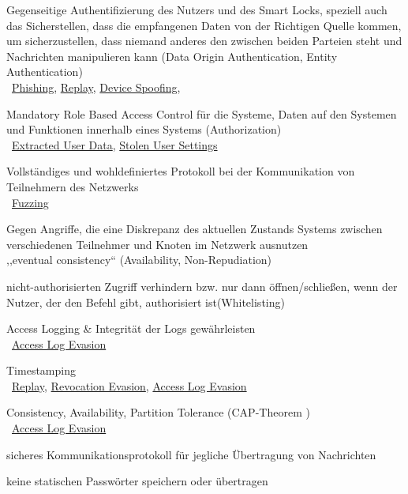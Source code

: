     \begin{SA}[noitemsep]
        \item \label{sa:1}Gegenseitige Authentifizierung des Nutzers und des Smart Locks, speziell auch das Sicherstellen, dass die empfangenen Daten von der Richtigen Quelle kommen, um sicherzustellen, dass niemand anderes den zwischen beiden Parteien steht und Nachrichten manipulieren kann (Data Origin Authentication, Entity Authentication)\\
            \textrightarrow\ \hyperref[vuln:phishing]{Phishing}, \hyperref[vuln:replay]{Replay}, \hyperref[vuln:spoofing]{Device Spoofing}, 
        \item \label{sa:2}Mandatory Role Based Access Control für die Systeme, Daten auf den Systemen und Funktionen innerhalb eines Systems (Authorization) \cite{Miessler2015}\\ 
            \textrightarrow\ \hyperref[vuln:userdata]{Extracted User Data}, \hyperref[vuln:usersettings]{Stolen User Settings}
        \item \label{sa:3}Vollständiges und wohldefiniertes Protokoll bei der Kommunikation von Teilnehmern des Netzwerks\\
            \textrightarrow\ \hyperref[vuln:fuzzing]{Fuzzing}
        \item \label{sa:4}Gegen Angriffe, die eine Diskrepanz des aktuellen Zustands Systems zwischen verschiedenen Teilnehmer und Knoten im Netzwerk ausnutzen\\
            \textrightarrow ,,eventual consistency`` (Availability, Non-Repudiation)\cite{Ho2016}
        \item \label{sa:5}nicht-authorisierten Zugriff verhindern bzw. nur dann öffnen/schließen, wenn der Nutzer, der den Befehl gibt, authorisiert ist(Whitelisting) \cite{Ho2016}
        \item \label{sa:6}Access Logging \& Integrität der Logs gewährleisten\\
            \textrightarrow\ \hyperref[vuln:accesslogevasion]{Access Log Evasion}
        \item \label{sa:7}Timestamping\\
            \textrightarrow\ \hyperref[vuln:replay]{Replay}, \hyperref[vuln:revocationevasion]{Revocation Evasion}, \hyperref[vuln:accesslogevasion]{Access Log Evasion}
        \item \label{sa:8}Consistency, Availability, Partition Tolerance (CAP-Theorem \cite{Brewer2012})\\
            \textrightarrow\ \hyperref[vuln:accesslogevasion]{Access Log Evasion}
        \item \label{sa:9}sicheres Kommunikationsprotokoll für jegliche Übertragung von Nachrichten\cite{Miessler,Ye2017}
        \item \label{sa:10}keine statischen Passwörter speichern oder übertragen\cite{Rose2016}
    \end{SA}
